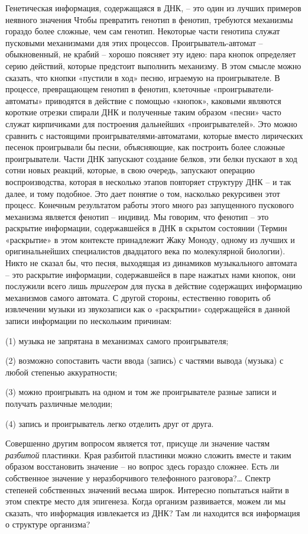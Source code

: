 \documentclass[../main.tex]{subfiles}
\begin{document}
Генетическая информация, содержащаяся в ДНК, \--- это один из лучших примеров неявного значения Чтобы превратить генотип в фенотип, требуются механизмы гораздо более сложные, чем сам генотип. Некоторые части генотипа служат пусковыми механизмами для этих процессов. Проигрыватель-автомат \--- обыкновенный, не крабий \--- хорошо поясняет эту идею: пара кнопок определяет серию действий, которые предстоит выполнить механизму. В этом смысле можно сказать, что кнопки «пустили в ход» песню, играемую на проигрывателе. В процессе, превращающем генотип в фенотип, клеточные «проигрыватели-автоматы» приводятся в действие с помощью «кнопок», каковыми являются короткие отрезки спирали ДНК и полученные таким образом «песни» часто служат кирпичиками для построения дальнейших «проигрывателей». Это можно сравнить с настоящими проигрывателями-автоматами, которые вместо лирических песенок проигрывали бы песни, объясняющие, как построить более сложные проигрыватели. Части ДНК запускают создание белков, эти белки пускают в ход сотни новых реакций, которые, в свою очередь, запускают операцию воспроизводства, которая в несколько этапов повторяет структуру ДНК \--- и так далее, и тому подобное. Это дает понятие о том, насколько рекурсивен этот процесс. Конечным результатом работы этого много раз запущенного пускового механизма является фенотип \--- индивид. Мы говорим, что фенотип \--- это раскрытие информации, содержавшейся в ДНК в скрытом состоянии (Термин «раскрытие» в этом контексте принадлежит Жаку Моноду, одному из лучших и оригинальнейших специалистов двадцатого века по молекулярной биологии). Никто не сказал бы, что песня, выходящая из динамиков музыкального автомата \--- это раскрытие информации, содержавшейся в паре нажатых нами кнопок, они послужили всего лишь \emph{триггером} для пуска в действие содержащих информацию механизмов самого автомата. С другой стороны, естественно говорить об извлечении музыки из звукозаписи как о «раскрытии» содержащейся в данной записи информации по нескольким причинам:

(1) музыка не запрятана в механизмах самого проигрывателя;

(2) возможно сопоставить части ввода (запись) с частями вывода (музыка) с любой степенью аккуратности;

(3) можно проигрывать на одном и том же проигрывателе разные записи и получать различные мелодии;

(4) запись и проигрыватель легко отделить друг от друга.

Совершенно другим вопросом является тот, присуще ли значение частям \emph{разбитой} пластинки. Края разбитой пластинки можно сложить вместе и таким образом восстановить значение \--- но вопрос здесь гораздо сложнее. Есть ли собственное значение у неразборчивого телефонного разговора?\ldots{} Спектр степеней собственных значений весьма широк. Интересно попытаться найти в этом спектре место для эпигенеза. Когда организм развивается, можем ли мы сказать, что информация извлекается из ДНК? Там ли находится вся информация о структуре организма?
\end{document}
